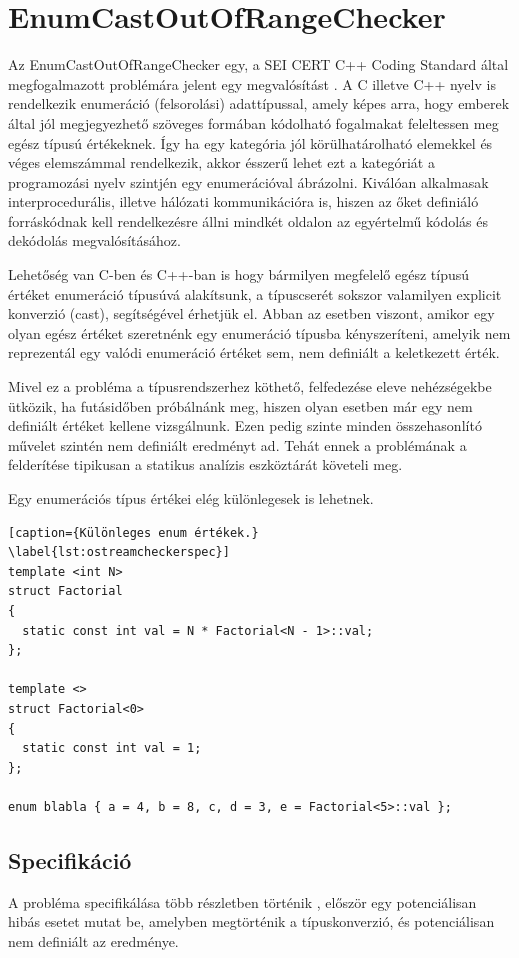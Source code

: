 \documentclass[a4paper,12pt]{report}
\begin{document}
\section{EnumCastOutOfRangeChecker}
Az EnumCastOutOfRangeChecker egy, a SEI CERT C++ Coding Standard által megfogalmazott problémára jelent egy megvalósítást \cite{securecodingint50}.
A C illetve C++ nyelv is rendelkezik enumeráció (felsorolási) adattípussal, amely képes arra, hogy emberek által jól megjegyezhető szöveges formában kódolható fogalmakat feleltessen meg egész típusú értékeknek. Így ha egy kategória jól körülhatárolható elemekkel és véges elemszámmal rendelkezik, akkor ésszerű lehet ezt a kategóriát a programozási nyelv szintjén egy enumerációval ábrázolni. Kiválóan alkalmasak interprocedurális, illetve hálózati kommunikációra is, hiszen az őket definiáló forráskódnak kell rendelkezésre állni mindkét oldalon az egyértelmű kódolás és dekódolás megvalósításához.

Lehetőség van C-ben és C++-ban is hogy bármilyen megfelelő egész típusú értéket enumeráció típusúvá alakítsunk, a típuscserét sokszor valamilyen explicit konverzió (cast), segítségével érhetjük el. Abban az esetben viszont, amikor egy olyan egész értéket szeretnénk egy enumeráció típusba kényszeríteni, amelyik nem reprezentál egy valódi enumeráció értéket sem, nem definiált a keletkezett érték.

Mivel ez a probléma a típusrendszerhez köthető, felfedezése eleve nehézségekbe ütközik, ha futásidőben próbálnánk meg, hiszen olyan esetben már egy nem definiált értéket kellene vizsgálnunk. Ezen pedig szinte minden összehasonlító művelet szintén nem definiált eredményt ad. Tehát ennek a problémának a felderítése tipikusan a statikus analízis eszköztárát követeli meg.

Egy enumerációs típus értékei elég különlegesek is lehetnek.

\begin{lstlisting}[caption={Különleges enum értékek.}
\label{lst:ostreamcheckerspec}]
template <int N>
struct Factorial
{
  static const int val = N * Factorial<N - 1>::val;
};

template <>
struct Factorial<0>
{
  static const int val = 1;
};

enum blabla { a = 4, b = 8, c, d = 3, e = Factorial<5>::val };
\end{lstlisting}


\subsection{Specifikáció}
A probléma specifikálása több részletben történik \cite{securecodingint50}, először egy potenciálisan hibás esetet mutat be, amelyben megtörténik a típuskonverzió, és potenciálisan nem definiált az eredménye.
\end{document}
